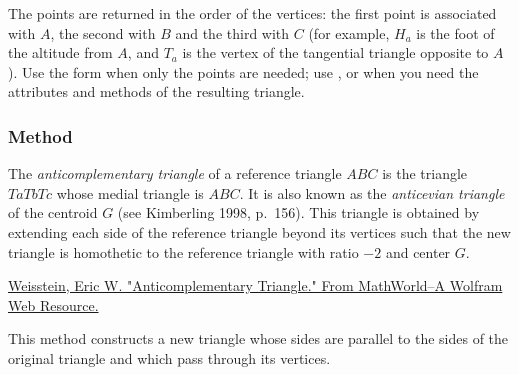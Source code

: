 The points are returned in the order of the vertices: the first point is associated with $A$, the second with $B$ and the third with $C$ (for example, $H_a$ is the foot of the altitude from $A$, and $T_a$ is the vertex of the tangential triangle opposite to $A$). Use the  form when only the points are needed; use ,  or  when you need the attributes and methods of the resulting triangle.

\begin{tkzexample}[latex=.45\textwidth]
\begin{center}
\end{center}
\end{tkzexample}

\subsubsection{Method } %
\label{ssub:method_triangle_anti}

The \emph{anticomplementary triangle} of a reference triangle $ABC$ is the triangle $TaTbTc$ whose medial triangle is $ABC$. It is also known as the \emph{anticevian triangle} of the centroid $G$ (see Kimberling 1998, p.~156). This triangle is obtained by extending each side of the reference triangle beyond its vertices such that the new triangle is homothetic to the reference triangle with ratio $-2$ and center $G$.\begin{flushright}
  \small
\href{https://mathworld.wolfram.com/AnticomplementaryTriangle.html}{Weisstein, Eric W. "Anticomplementary Triangle." From MathWorld--A Wolfram Web Resource.}
\end{flushright}

\medskip

This method constructs a new triangle whose sides are parallel to the sides of the original triangle and which pass through its vertices.


